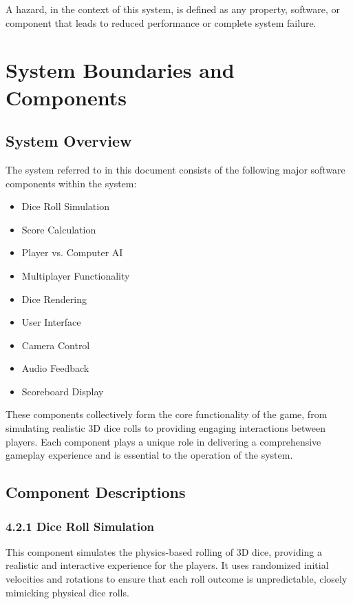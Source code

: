\documentclass{article}
\begin{document}
A hazard, in the context of this system, is defined as any property, software, or component that leads to reduced performance or complete system failure.

\section{System Boundaries and Components}

\subsection{System Overview}

The system referred to in this document consists of the following major software components within the system:

\begin{itemize}
    \item Dice Roll Simulation
    \item Score Calculation
    \item Player vs. Computer AI
    \item Multiplayer Functionality
    \item Dice Rendering
    \item User Interface
    \item Camera Control
    \item Audio Feedback
    \item Scoreboard Display
\end{itemize}

These components collectively form the core functionality of the game, from simulating realistic 3D dice rolls to providing engaging interactions between players. Each component plays a unique role in delivering a comprehensive gameplay experience and is essential to the operation of the system.

\subsection{Component Descriptions}

\subsubsection*{4.2.1 Dice Roll Simulation}
This component simulates the physics-based rolling of 3D dice, providing a realistic and interactive experience for the players. It uses randomized initial velocities and rotations to ensure that each roll outcome is unpredictable, closely mimicking physical dice rolls.
\end{document}
